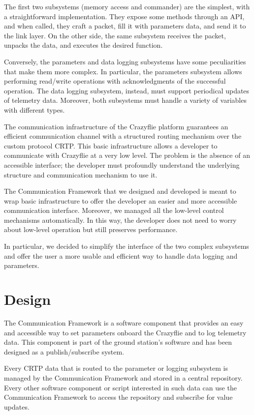 The first two subsystems (memory access and commander) are the simplest, with a straightforward implementation. 
They expose some methods through an API, and when called, they craft a packet, fill it with parameters data, and send it to the link layer.
On the other side, the same subsystem receives the packet, unpacks the data, and executes the desired function.

Conversely, the parameters and data logging subsystems have some peculiarities that make them more complex. 
In particular, the parameters subsystem allows performing read/write operations with acknowledgments of the successful operation.
The data logging subsystem, instead, must support periodical updates of telemetry data.
Moreover, both subsystems must handle a variety of variables with different types.

The communication infrastructure of the Crazyflie platform guarantees an efficient communication channel with a structured routing mechanism over the custom protocol CRTP.
This basic infrastructure allows a developer to communicate with Crazyflie at a very low level.
The problem is the absence of an accessible interface; the developer must profoundly understand the underlying structure and communication mechanism to use it.

The Communication Framework that we designed and developed is meant to wrap basic infrastructure to offer the developer an easier and more accessible communication interface.
Moreover, we managed all the low-level control mechanisms automatically. 
In this way, the developer does not need to worry about low-level operation but still preserves performance.

In particular, we decided to simplify the interface of the two complex subsystems and offer the user a more usable and efficient way to handle data logging and parameters.

\section{Design}\label{sec:communication_frameworks_design}

The Communication Framework is a software component that provides an easy and accessible way to set parameters onboard the Crazyflie and to log telemetry data.
This component is part of the ground station's software and has been designed as a publish/subscribe system.

Every CRTP data that is routed to the parameter or logging subsystem is managed by the Communication Framework and stored in a central repository.
Every other software component or script interested in such data can use the Communication Framework to access the repository and subscribe for value updates.

